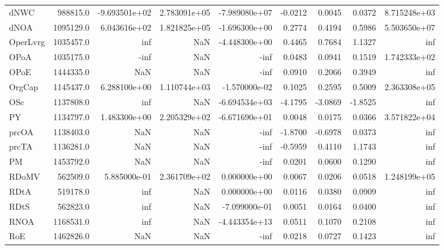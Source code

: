 \begin{tabular}{lrrrrrrrr}
dNWC      &   988815.0 & -9.693501e+02 &  2.783091e+05 & -7.989080e+07 &    -0.0212 &     0.0045 &     0.0372 &  8.715248e+03 \\
dNOA      &  1095129.0 &  6.043616e+02 &  1.821825e+05 & -1.696300e+00 &     0.2774 &     0.4194 &     0.5986 &  5.503650e+07 \\
OperLvrg  &  1035457.0 &           inf &           NaN & -4.448300e+00 &     0.4465 &     0.7684 &     1.1327 &           inf \\
OPoA      &  1035175.0 &          -inf &           NaN &          -inf &     0.0483 &     0.0941 &     0.1519 &  1.742333e+02 \\
OPoE      &  1444335.0 &           NaN &           NaN &          -inf &     0.0910 &     0.2066 &     0.3949 &           inf \\
OrgCap    &  1145437.0 &  6.288100e+00 &  1.110744e+03 & -1.570000e-02 &     0.1025 &     0.2595 &     0.5009 &  2.363308e+05 \\
OSc       &  1137808.0 &           inf &           NaN & -6.694534e+03 &    -4.1795 &    -3.0869 &    -1.8525 &           inf \\
PY        &  1134797.0 &  1.483300e+00 &  2.205329e+02 & -6.671690e+01 &     0.0048 &     0.0175 &     0.0366 &  3.571822e+04 \\
prcOA     &  1138403.0 &           NaN &           NaN &          -inf &    -1.8700 &    -0.6978 &     0.0373 &           inf \\
prcTA     &  1136281.0 &           NaN &           NaN &          -inf &    -0.5959 &     0.4110 &     1.1743 &           inf \\
PM        &  1453792.0 &           NaN &           NaN &          -inf &     0.0201 &     0.0600 &     0.1290 &           inf \\
RDoMV     &   562509.0 &  5.885000e-01 &  2.361709e+02 &  0.000000e+00 &     0.0067 &     0.0206 &     0.0518 &  1.248199e+05 \\
RDtA      &   519178.0 &           inf &           NaN &  0.000000e+00 &     0.0116 &     0.0380 &     0.0909 &           inf \\
RDtS      &   562823.0 &           inf &           NaN & -7.099000e-01 &     0.0051 &     0.0164 &     0.0400 &           inf \\
RNOA      &  1168531.0 &           inf &           NaN & -4.443354e+13 &     0.0511 &     0.1070 &     0.2108 &           inf \\
RoE       &  1462826.0 &           NaN &           NaN &          -inf &     0.0218 &     0.0727 &     0.1423 &           inf \\

\end{tabular}

